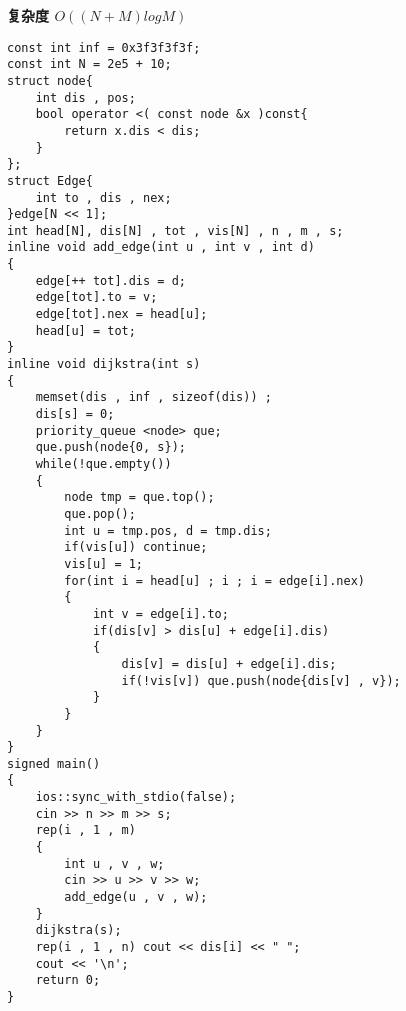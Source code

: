 \documentclass[E:/GsjzTle/main/main.tex]{subfiles}
\begin{document}
\textbf{复杂度 \(O((N+M)logM)\)}

\begin{lstlisting}
const int inf = 0x3f3f3f3f;
const int N = 2e5 + 10;
struct node{
	int dis , pos;
	bool operator <( const node &x )const{
		return x.dis < dis;
	}
};
struct Edge{
	int to , dis , nex;
}edge[N << 1];
int head[N], dis[N] , tot , vis[N] , n , m , s;
inline void add_edge(int u , int v , int d)
{
	edge[++ tot].dis = d;
	edge[tot].to = v;
	edge[tot].nex = head[u];
	head[u] = tot;
}
inline void dijkstra(int s)
{
	memset(dis , inf , sizeof(dis)) ;
	dis[s] = 0;
	priority_queue <node> que;
	que.push(node{0, s});
	while(!que.empty())
	{
		node tmp = que.top();
		que.pop();
		int u = tmp.pos, d = tmp.dis;
		if(vis[u]) continue;
		vis[u] = 1;
		for(int i = head[u] ; i ; i = edge[i].nex)
		{
			int v = edge[i].to;
			if(dis[v] > dis[u] + edge[i].dis)
			{
				dis[v] = dis[u] + edge[i].dis;
				if(!vis[v]) que.push(node{dis[v] , v});
			}
		}
	}
}
signed main()
{
	ios::sync_with_stdio(false);
	cin >> n >> m >> s;
	rep(i , 1 , m)
	{
		int u , v , w;
		cin >> u >> v >> w;
		add_edge(u , v , w);
	}
	dijkstra(s);
	rep(i , 1 , n) cout << dis[i] << " ";
	cout << '\n';
	return 0;
}
\end{lstlisting}
\end{document}
